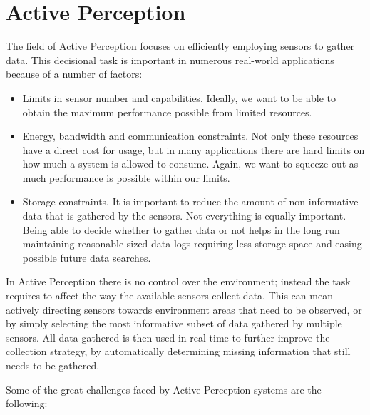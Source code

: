 \section{Active Perception}

The field of Active Perception focuses on efficiently employing sensors to gather data. This
decisional task is important in numerous real-world applications because of a number of factors:

\begin{itemize}
\item Limits in sensor number and capabilities. Ideally, we want to be able to obtain the maximum
performance possible from limited resources.
\item Energy, bandwidth and communication constraints. Not only these resources have a direct cost for
usage, but in many applications there are hard limits on how much a system is allowed to consume.
Again, we want to squeeze out as much performance is possible within our limits.
\item Storage constraints. It is important to reduce the amount of non-informative data that is gathered
by the sensors. Not everything is equally important. Being able to decide whether to gather data or
not helps in the long run maintaining reasonable sized data logs requiring less storage space and
easing possible future data searches.
\end{itemize}

In Active Perception there is no control over the environment; instead the task requires to affect
the way the available sensors collect data. This can mean actively directing sensors towards
environment areas that need to be observed, or by simply selecting the most informative subset
of data gathered by multiple sensors. All data gathered is then used in real time to further improve
the collection strategy, by automatically determining missing information that still needs to be
gathered.

Some of the great challenges faced by Active Perception systems are the following:

